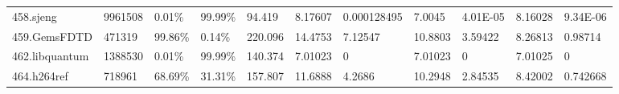 \documentclass[11pt]{article}
\begin{document}
\begin{landscape}
\begin{table}
\begin{tabular}{lllllllllll}
458.sjeng                                                                                 & 9961508                                                                                      & 0.01\%                                                                                          & 99.99\%                                                                                          & 94.419                                                                                           & 8.17607                           & 0.000128495                       & 7.0045                            & 4.01E-05                          & 8.16028                           & 9.34E-06                          \\
459.GemsFDTD                                                                              & 471319                                                                                       & 99.86\%                                                                                         & 0.14\%                                                                                           & 220.096                                                                                          & 14.4753                           & 7.12547                           & 10.8803                           & 3.59422                           & 8.26813                           & 0.98714                           \\
462.libquantum                                                                            & 1388530                                                                                      & 0.01\%                                                                                          & 99.99\%                                                                                          & 140.374                                                                                          & 7.01023                           & 0                                 & 7.01023                           & 0                                 & 7.01025                           & 0                                 \\
464.h264ref                                                                               & 718961                                                                                       & 68.69\%                                                                                         & 31.31\%                                                                                          & 157.807                                                                                          & 11.6888                           & 4.2686                            & 10.2948                           & 2.84535                           & 8.42002                           & 0.742668                          \\

\end{tabular}
\end{table}
\end{landscape}
\end{document}
